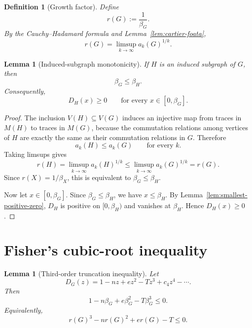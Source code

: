 \documentclass[11pt]{article}
\newtheorem{lemma}[theorem]{Lemma}
\newtheorem{definition}[theorem]{Definition}
\newcommand{\V}{V}
\begin{document}
\begin{definition}[Growth factor]
Define
\[
        r(G):=\frac{1}{\beta_G}.
\]
By the Cauchy--Hadamard formula and Lemma~\ref{lem:cartier-foata},
\[
        r(G)=\limsup_{k\to\infty} a_k(G)^{1/k}.
\]
\end{definition}

\begin{lemma}[Induced-subgraph monotonicity]
\label{lem:induced-monotonicity}
If \(H\) is an induced subgraph of \(G\), then
\[
        \beta_G\le \beta_H.
\]
Consequently,
\[
        D_H(x)\ge 0
        \qquad\text{for every }x\in[0,\beta_G].
\]
\end{lemma}

\begin{proof}
The inclusion \(\V(H)\subseteq \V(G)\) induces an injective map from traces in \(M(H)\)
to traces in \(M(G)\), because the commutation relations among vertices of \(H\) are
exactly the same as their commutation relations in \(G\).  Therefore
\[
        a_k(H)\le a_k(G)
        \qquad\text{for every }k.
\]
Taking limsups gives
\[
        r(H)
        =
        \limsup_{k\to\infty}a_k(H)^{1/k}
        \le
        \limsup_{k\to\infty}a_k(G)^{1/k}
        =
        r(G).
\]
Since \(r(X)=1/\beta_X\), this is equivalent to \(\beta_G\le \beta_H\).

Now let \(x\in[0,\beta_G]\).  Since \(\beta_G\le\beta_H\), we have \(x\le\beta_H\).
By Lemma~\ref{lem:smallest-positive-zero}, \(D_H\) is positive on \([0,\beta_H)\) and
vanishes at \(\beta_H\).  Hence \(D_H(x)\ge 0\).
\end{proof}

\section{Fisher's cubic-root inequality}

\begin{lemma}[Third-order truncation inequality]
\label{lem:third-truncation}
Let
\[
        D_G(z)=1-nz+ez^2-Tz^3+c_4z^4-\cdots.
\]
Then
\[
        1-n\beta_G+e\beta_G^2-T\beta_G^3\le 0.
\]
Equivalently,
\[
        r(G)^3-nr(G)^2+er(G)-T\le 0.
\]
\end{lemma}
\end{document}
